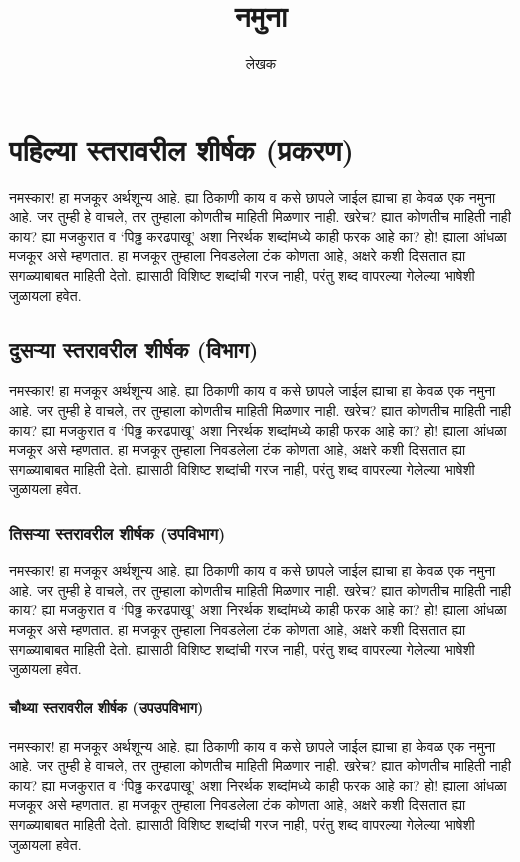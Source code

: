 \title{नमुना}
\author{लेखक}
\maketitle
\tableofcontents
\chapter{पहिल्या स्तरावरील शीर्षक (प्रकरण)}
नमस्कार! हा मजकूर अर्थशून्य आहे. ह्या ठिकाणी काय व कसे छापले जाईल ह्याचा हा केवळ एक नमुना आहे. जर तुम्ही हे वाचले, तर तुम्हाला कोणतीच माहिती मिळणार नाही. खरेच? ह्यात कोणतीच माहिती नाही काय? ह्या मजकुरात व `पिढ्ढ करढपाखू' अशा निरर्थक शब्दांमध्ये काही फरक आहे का? हो! ह्याला आंधळा मजकूर असे म्हणतात. हा मजकूर तुम्हाला निवडलेला टंक कोणता आहे, अक्षरे कशी दिसतात ह्या सगळ्याबाबत माहिती देतो. ह्यासाठी विशिष्ट शब्दांची गरज नाही, परंतु शब्द वापरल्या गेलेल्या भाषेशी जुळायला हवेत.
\section{दुसऱ्या स्तरावरील शीर्षक (विभाग)}
नमस्कार! हा मजकूर अर्थशून्य आहे. ह्या ठिकाणी काय व कसे छापले जाईल ह्याचा हा केवळ एक नमुना आहे. जर तुम्ही हे वाचले, तर तुम्हाला कोणतीच माहिती मिळणार नाही. खरेच? ह्यात कोणतीच माहिती नाही काय? ह्या मजकुरात व `पिढ्ढ करढपाखू' अशा निरर्थक शब्दांमध्ये काही फरक आहे का? हो! ह्याला आंधळा मजकूर असे म्हणतात. हा मजकूर तुम्हाला निवडलेला टंक कोणता आहे, अक्षरे कशी दिसतात ह्या सगळ्याबाबत माहिती देतो. ह्यासाठी विशिष्ट शब्दांची गरज नाही, परंतु शब्द वापरल्या गेलेल्या भाषेशी जुळायला हवेत.
\subsection{तिसऱ्या स्तरावरील शीर्षक (उपविभाग)}
नमस्कार! हा मजकूर अर्थशून्य आहे. ह्या ठिकाणी काय व कसे छापले जाईल ह्याचा हा केवळ एक नमुना आहे. जर तुम्ही हे वाचले, तर तुम्हाला कोणतीच माहिती मिळणार नाही. खरेच? ह्यात कोणतीच माहिती नाही काय? ह्या मजकुरात व `पिढ्ढ करढपाखू' अशा निरर्थक शब्दांमध्ये काही फरक आहे का? हो! ह्याला आंधळा मजकूर असे म्हणतात. हा मजकूर तुम्हाला निवडलेला टंक कोणता आहे, अक्षरे कशी दिसतात ह्या सगळ्याबाबत माहिती देतो. ह्यासाठी विशिष्ट शब्दांची गरज नाही, परंतु शब्द वापरल्या गेलेल्या भाषेशी जुळायला हवेत.
\subsubsection{चौथ्या स्तरावरील शीर्षक (उपउपविभाग)}
नमस्कार! हा मजकूर अर्थशून्य आहे. ह्या ठिकाणी काय व कसे छापले जाईल ह्याचा हा केवळ एक नमुना आहे. जर तुम्ही हे वाचले, तर तुम्हाला कोणतीच माहिती मिळणार नाही. खरेच? ह्यात कोणतीच माहिती नाही काय? ह्या मजकुरात व `पिढ्ढ करढपाखू' अशा निरर्थक शब्दांमध्ये काही फरक आहे का? हो! ह्याला आंधळा मजकूर असे म्हणतात. हा मजकूर तुम्हाला निवडलेला टंक कोणता आहे, अक्षरे कशी दिसतात ह्या सगळ्याबाबत माहिती देतो. ह्यासाठी विशिष्ट शब्दांची गरज नाही, परंतु शब्द वापरल्या गेलेल्या भाषेशी जुळायला हवेत.
